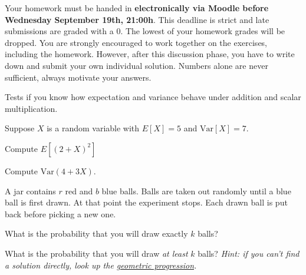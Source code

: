 \documentclass[a4paper,10pt,landscape,twocolumn]{scrartcl}
\newcommand\deadline{Wednesday September 19th, 21:00h}
\begin{document}
\homeworkproblems

{\sffamily\noindent
Your homework must be handed in \textbf{electronically via Moodle before \deadline}. This deadline is strict and late submissions are graded with a 0. The lowest of your homework grades will be dropped. You are strongly encouraged to work together on the exercises, including the homework. However, after this discussion phase, you have to write down and submit your own individual solution. Numbers alone are never sufficient, always motivate your answers.
}



\begin{exercise}
	\begin{mycomment}
		Tests if you know how expectation and variance behave under addition and scalar multiplication.
	\end{mycomment}
	
	Suppose $X$ is a random variable with $E[X] = 5$ and $\mathrm{Var}[X] = 7$.	
	\begin{subex}[0.5pt]
	Compute $E[(2+X)^2]$
	\end{subex}	
	
	\begin{subex}[0.5pt]
	Compute $\mathrm{Var}(4+3X)$.
	\end{subex}

\end{exercise}


\begin{exercise}
A jar contains $r$ red and $b$ blue balls. Balls are taken out randomly until a blue ball is first drawn. At that point the experiment stops. Each drawn ball is put back before picking a new one.
	\begin{subex}[1pt]
		What is the probability that you will draw exactly $k$ balls? 
	\end{subex}
	
	\begin{subex}[1.5pt]
		What is the probability that you will draw \emph{at least} $k$ balls? \emph{Hint: if you can't find a solution directly, look up the \href{https://en.wikipedia.org/wiki/Geometric Progression}{geometric progression}.}
	\end{subex}
\end{exercise}
\end{document}
